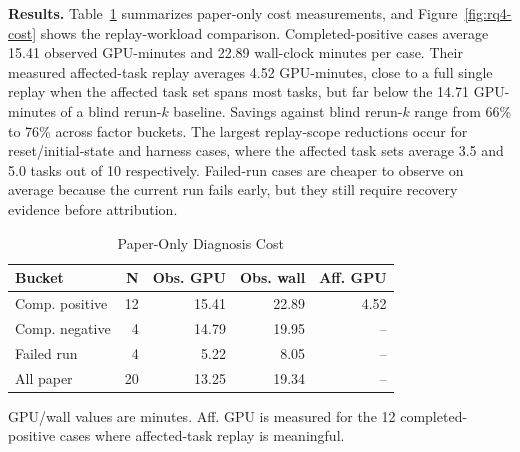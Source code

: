 \noindent\textbf{Results.} Table~\ref{tab:cost} summarizes paper-only cost measurements, and Figure~\ref{fig:rq4-cost} shows the replay-workload comparison. Completed-positive cases average 15.41 observed GPU-minutes and 22.89 wall-clock minutes per case. Their measured affected-task replay averages 4.52 GPU-minutes, close to a full single replay when the affected task set spans most tasks, but far below the 14.71 GPU-minutes of a blind rerun-$k$ baseline. Savings against blind rerun-$k$ range from 66\% to 76\% across factor buckets. The largest replay-scope reductions occur for reset/initial-state and harness cases, where the affected task sets average 3.5 and 5.0 tasks out of 10 respectively. Failed-run cases are cheaper to observe on average because the current run fails early, but they still require recovery evidence before attribution.

\begin{table}[!t]
  \caption{Paper-Only Diagnosis Cost}
  \label{tab:cost}
  \centering
  \scriptsize
  \renewcommand{\arraystretch}{1.10}
  \begin{tabular}{@{}lrrrr@{}}
    \toprule
    Bucket & N & Obs. GPU & Obs. wall & Aff. GPU \\
    \midrule
    Comp. positive & 12 & 15.41 & 22.89 & 4.52 \\
    Comp. negative & 4 & 14.79 & 19.95 & -- \\
    Failed run & 4 & 5.22 & 8.05 & -- \\
    All paper & 20 & 13.25 & 19.34 & -- \\
    \bottomrule
  \end{tabular}
  \vspace{1pt}
  \parbox{0.96\columnwidth}{\scriptsize GPU/wall values are minutes. Aff. GPU is measured for the 12 completed-positive cases where affected-task replay is meaningful.}
\end{table}
